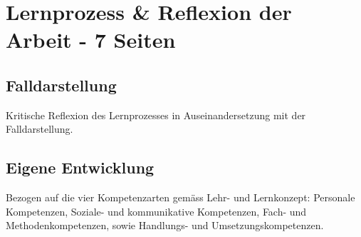 \section{Lernprozess \& Reflexion der Arbeit - 7 Seiten}\label{Reflexion}
\subsection{Falldarstellung} Kritische Reflexion des Lernprozesses in Auseinandersetzung mit der Falldarstellung.
\subsection{Eigene Entwicklung} Bezogen auf die vier Kompetenzarten gemäss Lehr- und Lernkonzept: Personale Kompetenzen, Soziale- und kommunikative Kompetenzen, Fach- und Methodenkompetenzen, sowie Handlungs- und Umsetzungskompetenzen.
